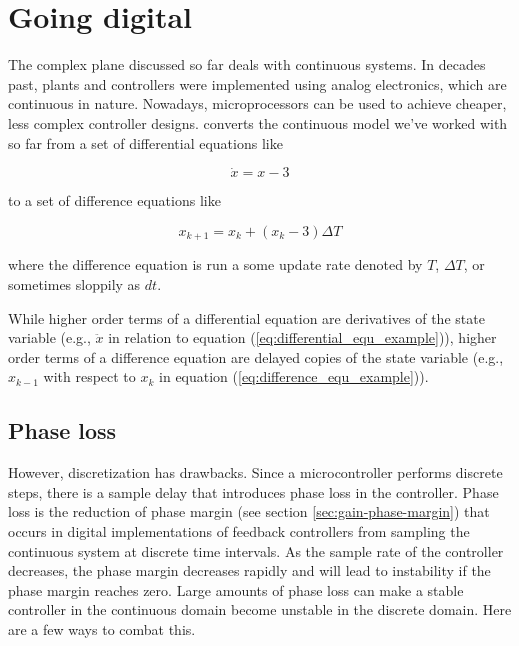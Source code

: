 
\chapter{Going digital}

The complex plane discussed so far deals with continuous \glspl{system}. In
decades past, \glspl{plant} and controllers were implemented using analog
electronics, which are continuous in nature. Nowadays, microprocessors can be
used to achieve cheaper, less complex controller designs.
 converts the continuous model we've
worked with so far from a set of differential equations like

\begin{equation}
  \dot{x} = x - 3 \label{eq:differential_equ_example}
\end{equation}

to a set of difference equations like

\begin{equation}
  x_{k+1} = x_k + (x_k - 3) \Delta T \label{eq:difference_equ_example}
\end{equation}

where the difference equation is run a some update rate denoted by $T$,
$\Delta T$, or sometimes sloppily as $dt$.

While higher order terms of a differential equation are derivatives of the state
variable (e.g., $\ddot{x}$ in relation to equation
(\ref{eq:differential_equ_example})), higher order terms of a difference
equation are delayed copies of the state variable (e.g., $x_{k-1}$ with respect
to $x_k$ in equation (\ref{eq:difference_equ_example})).

\section{Phase loss}

However, \gls{discretization} has drawbacks. Since a microcontroller performs
discrete steps, there is a sample delay that introduces phase loss in the
controller. Phase loss is the reduction of phase margin (see section
\ref{sec:gain-phase-margin}) that occurs in digital implementations of feedback
controllers from sampling the continuous system at discrete time intervals. As
the sample rate of the controller decreases, the phase margin decreases rapidly
and will lead to instability if the phase margin reaches zero. Large amounts of
phase loss can make a stable controller in the continuous domain become unstable
in the discrete domain. Here are a few ways to combat this.

